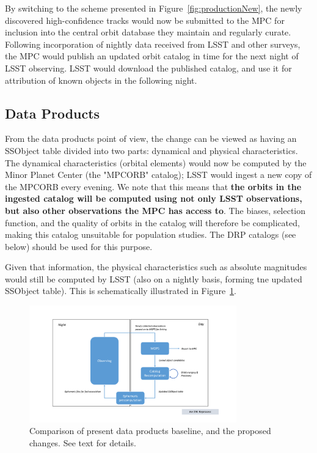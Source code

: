 \documentclass[DM,authoryear,toc,lsstdraft]{lsstdoc}
\begin{document}
By switching to the scheme presented in Figure~\ref{fig:productionNew}, the newly discovered high-confidence tracks would now be submitted to the MPC for inclusion into the central orbit database they maintain and regularly curate. Following incorporation of nightly data received from LSST and other surveys, the MPC would publish an updated orbit catalog in time for the next night of LSST observing. LSST would download the published catalog, and use it for attribution of known objects in the following night.

\subsection{Data Products}

From the data products point of view, the change can be viewed as having an SSObject table divided into two parts: dynamical and physical characteristics. The dynamical characteristics (orbital elements) would now be computed by the Minor Planet Center (the "MPCORB" catalog); LSST would ingest a new copy of the MPCORB every evening. We note that this means that {\bf the orbits in the ingested catalog will be computed using not only LSST observations, but also other observations the MPC has access to}. The biases, selection function, and the quality of orbits in the catalog will therefore be complicated, making this catalog unsuitable for population studies. The DRP catalogs (see below) should be used for this purpose.

Given that information, the physical characteristics such as absolute magnitudes would still be computed by LSST (also on a nightly basis, forming tne updated SSObject table). This is schematically illustrated in Figure~\ref{fig:productsComparison}.

\begin{figure}
	\caption{Comparison of present data products baseline, and the proposed changes. See text for details.\label{fig:productsComparison}}
	\centering
	\includegraphics[page=3,width=0.8\textwidth]{figures/processing.pdf}
\end{figure}
\end{document}
